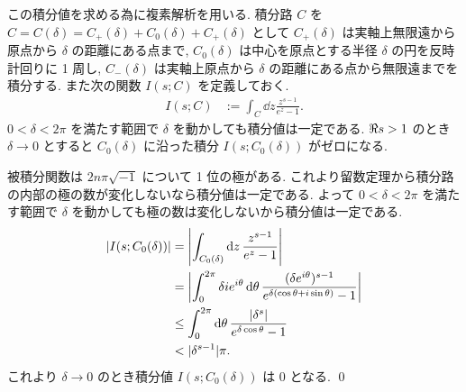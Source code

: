 \documentclass[uplatex,dvipdfmx,a4paper,11pt]{jlreq}
\makeatletter
\theoremstyle{definition}
\renewenvironment{proof}[1][\proofname]{\par
  \normalfont
  \topsep6\p@\@plus6\p@ \trivlist
  \item[\hskip\labelsep{\bfseries #1}\@addpunct{\bfseries}]\ignorespaces\quad\par
}{%
  \qed\endtrivlist\@endpefalse
}
\renewcommand\proofname{証明}
\makeatother
\begin{document}
\begin{proposition}
  この積分値を求める為に複素解析を用いる. 積分路 $C$ を $C = C(\delta) = C_+(\delta) + C_0(\delta) + C_+(\delta)$ として $C_+(\delta)$ は実軸上無限遠から原点から $\delta$ の距離にある点まで, $C_0(\delta)$ は中心を原点とする半径 $\delta$ の円を反時計回りに 1 周し, $C_-(\delta)$ は実軸上原点から $\delta$ の距離にある点から無限遠までを積分する. また次の関数 $I(s; C)$ を定義しておく.
  \begin{align}
    I(s; C) & := \int_C\dd{z}\frac{z^{s-1}}{e^z - 1}.
  \end{align}
  $0 <\delta < 2\pi$ を満たす範囲で $\delta$ を動かしても積分値は一定である.
  $\real s > 1$ のとき $\delta\to 0$ とすると $C_0(\delta)$ に沿った積分 $I(s;C_0(\delta))$ がゼロになる.
\end{proposition}
\begin{proof}
  被積分関数は $2n\pi\sqrt{-1}$ について 1 位の極がある. これより留数定理から積分路の内部の極の数が変化しないなら積分値は一定である. よって $0 <\delta < 2\pi$ を満たす範囲で $\delta$ を動かしても極の数は変化しないから積分値は一定である.
  \begin{align}
    |I(s;C_0(\delta))| & = \qty|\int_{C_0(\delta)}\dd{z}\frac{z^{s-1}}{e^z - 1}|                                                                        \\
                       & = \qty|\int_0^{2\pi}\delta ie^{i\theta}\dd{\theta}\frac{(\delta e^{i\theta})^{s-1}}{e^{\delta(\cos\theta + i\sin\theta)} - 1}| \\
                       & \leq \int_0^{2\pi}\dd{\theta}\frac{|\delta^s|}{e^{\delta\cos\theta} - 1}                                                       \\
                       & < |\delta^{s-1}|\pi.
  \end{align}
  これより $\delta\to 0$ のとき積分値 $I(s; C_0(\delta))$ は $0$ となる.
\end{proof}
\end{document}
